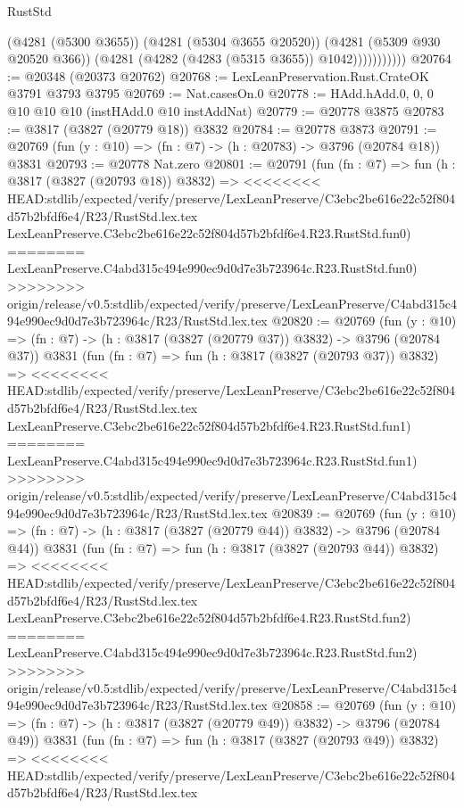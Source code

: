 \begin{lexlean}{RustStd}
\begin{coremodule}
{\begin{coremodule}
{{{{{{{{{{{{{{{{{{{{{{{{{{{{{{{{{{{                      (@4281 (@5300 @3655))
                      (@4281 (@5304 @3655 @20520))
                      (@4281 (@5309 @930 @20520 @366))
                      (@4281 (@4282 (@4283 (@5315 @3655)) @1042)))))))))))
@20764 := @20348 (@20373 @20762)
@20768 := LexLeanPreservation.Rust.CrateOK @3791 @3793 @3795
@20769 := Nat.casesOn.{0}
@20778 := HAdd.hAdd.{0, 0, 0} @10 @10 @10 (instHAdd.{0} @10 instAddNat)
@20779 := @20778 @3875
@20783 := @3817 (@3827 (@20779 @18)) @3832
@20784 := @20778 @3873
@20791 := @20769 (fun (y : @10) => (fn : @7) -> (h : @20783) -> @3796 (@20784 @18)) @3831
@20793 := @20778 Nat.zero
@20801 := @20791
    (fun (fn : @7) =>
    fun (h : @3817 (@3827 (@20793 @18)) @3832) =>
<<<<<<<< HEAD:stdlib/expected/verify/preserve/LexLeanPreserve/C3ebc2be616e22c52f804d57b2bfdf6e4/R23/RustStd.lex.tex
    LexLeanPreserve.C3ebc2be616e22c52f804d57b2bfdf6e4.R23.RustStd.fun0)
========
    LexLeanPreserve.C4abd315c494e990ec9d0d7e3b723964c.R23.RustStd.fun0)
>>>>>>>> origin/release/v0.5:stdlib/expected/verify/preserve/LexLeanPreserve/C4abd315c494e990ec9d0d7e3b723964c/R23/RustStd.lex.tex
@20820 := @20769
    (fun (y : @10) => (fn : @7) -> (h : @3817 (@3827 (@20779 @37)) @3832) -> @3796 (@20784 @37))
    @3831
    (fun (fn : @7) =>
    fun (h : @3817 (@3827 (@20793 @37)) @3832) =>
<<<<<<<< HEAD:stdlib/expected/verify/preserve/LexLeanPreserve/C3ebc2be616e22c52f804d57b2bfdf6e4/R23/RustStd.lex.tex
    LexLeanPreserve.C3ebc2be616e22c52f804d57b2bfdf6e4.R23.RustStd.fun1)
========
    LexLeanPreserve.C4abd315c494e990ec9d0d7e3b723964c.R23.RustStd.fun1)
>>>>>>>> origin/release/v0.5:stdlib/expected/verify/preserve/LexLeanPreserve/C4abd315c494e990ec9d0d7e3b723964c/R23/RustStd.lex.tex
@20839 := @20769
    (fun (y : @10) => (fn : @7) -> (h : @3817 (@3827 (@20779 @44)) @3832) -> @3796 (@20784 @44))
    @3831
    (fun (fn : @7) =>
    fun (h : @3817 (@3827 (@20793 @44)) @3832) =>
<<<<<<<< HEAD:stdlib/expected/verify/preserve/LexLeanPreserve/C3ebc2be616e22c52f804d57b2bfdf6e4/R23/RustStd.lex.tex
    LexLeanPreserve.C3ebc2be616e22c52f804d57b2bfdf6e4.R23.RustStd.fun2)
========
    LexLeanPreserve.C4abd315c494e990ec9d0d7e3b723964c.R23.RustStd.fun2)
>>>>>>>> origin/release/v0.5:stdlib/expected/verify/preserve/LexLeanPreserve/C4abd315c494e990ec9d0d7e3b723964c/R23/RustStd.lex.tex
@20858 := @20769
    (fun (y : @10) => (fn : @7) -> (h : @3817 (@3827 (@20779 @49)) @3832) -> @3796 (@20784 @49))
    @3831
    (fun (fn : @7) =>
    fun (h : @3817 (@3827 (@20793 @49)) @3832) =>
<<<<<<<< HEAD:stdlib/expected/verify/preserve/LexLeanPreserve/C3ebc2be616e22c52f804d57b2bfdf6e4/R23/RustStd.lex.tex
}}}}}}}}}}}}}}}}}}}}}}}}}}}}}}}}}}}
\end{coremodule}}
\end{coremodule}
\end{lexlean}
